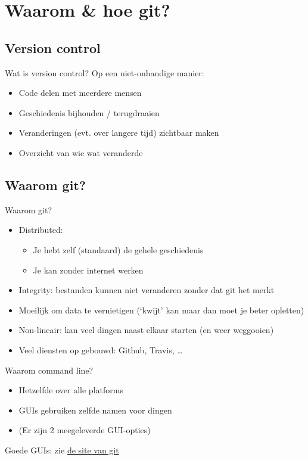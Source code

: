 \section{Waarom \& hoe git?}

\subsection{Version control}
\begin{frame}{Wat is version control?}
	Op een niet-onhandige manier:
		\begin{itemize}
			\item Code delen met meerdere mensen
			\item Geschiedenis bijhouden / terugdraaien
			\item Veranderingen (evt. over langere tijd) zichtbaar maken
			\item Overzicht van wie wat veranderde
		\end{itemize}
\end{frame}

\subsection{Waarom git?}
\begin{frame}{Waarom git?}
	\begin{itemize}
		\item Distributed:
			\begin{itemize}
				\item Je hebt zelf (standaard) de gehele geschiedenis
				\item Je kan zonder internet werken
			\end{itemize}
		\item Integrity: bestanden kunnen niet veranderen zonder dat git het merkt
		\item Moeilijk om data te vernietigen (`kwijt' kan maar dan moet je beter opletten)
		\item Non-lineair: kan veel dingen naast elkaar starten (en weer weggooien)
		\item Veel diensten op gebouwd: Github, Travis, \ldots
	\end{itemize}
\end{frame}

\begin{frame}{Waarom command line?}
	\begin{itemize}
		\item Hetzelfde over alle platforms
		\item GUIs gebruiken zelfde namen voor dingen
		\item (Er zijn 2 meegeleverde GUI-opties)
	\end{itemize}
	Goede GUIs: zie \href{https://git-scm.com/downloads/guis}{de site van git}
\end{frame}
